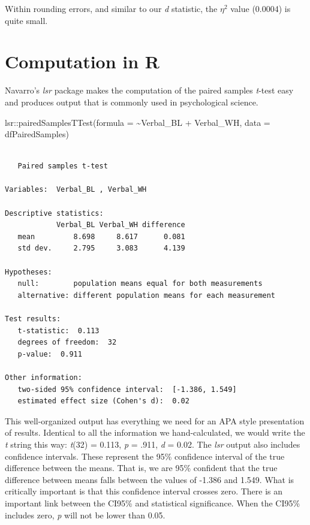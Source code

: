 \documentclass[
  11pt,
]{book}
\newenvironment{Shaded}{\begin{snugshade}}{\end{snugshade}}
\newcommand{\AttributeTok}[1]{\textcolor[rgb]{0.77,0.63,0.00}{#1}}
\newcommand{\FunctionTok}[1]{\textcolor[rgb]{0.00,0.00,0.00}{#1}}
\newcommand{\NormalTok}[1]{#1}
\newcommand{\SpecialCharTok}[1]{\textcolor[rgb]{0.00,0.00,0.00}{#1}}
\begin{document}
Within rounding errors, and similar to our \emph{d} statistic, the \(\eta^2\) value (0.0004) is quite small.

\hypertarget{computation-in-r-2}{%
\section{Computation in R}\label{computation-in-r-2}}

Navarro's \emph{lsr} package makes the computation of the paired samples \emph{t}-test easy and produces output that is commonly used in psychological science.

\begin{Shaded}
\begin{Highlighting}[]
\NormalTok{lsr}\SpecialCharTok{::}\FunctionTok{pairedSamplesTTest}\NormalTok{(}\AttributeTok{formula =} \SpecialCharTok{\textasciitilde{}}\NormalTok{Verbal\_BL }\SpecialCharTok{+}\NormalTok{ Verbal\_WH, }\AttributeTok{data =}\NormalTok{ dfPairedSamples)}
\end{Highlighting}
\end{Shaded}

\begin{verbatim}

   Paired samples t-test 

Variables:  Verbal_BL , Verbal_WH 

Descriptive statistics: 
            Verbal_BL Verbal_WH difference
   mean         8.698     8.617      0.081
   std dev.     2.795     3.083      4.139

Hypotheses: 
   null:        population means equal for both measurements
   alternative: different population means for each measurement

Test results: 
   t-statistic:  0.113 
   degrees of freedom:  32 
   p-value:  0.911 

Other information: 
   two-sided 95% confidence interval:  [-1.386, 1.549] 
   estimated effect size (Cohen's d):  0.02 
\end{verbatim}

This well-organized output has everything we need for an APA style presentation of results. Identical to all the information we hand-calculated, we would write the \emph{t} string this way: \emph{t}(32) = 0.113, \emph{p} = .911, \emph{d} = 0.02. The \emph{lsr} output also includes confidence intervals. These represent the 95\% confidence interval of the true difference between the means. That is, we are 95\% confident that the true difference between means falls between the values of -1.386 and 1.549. What is critically important is that this confidence interval crosses zero. There is an important link between the CI95\% and statistical significance. When the CI95\% includes zero, \emph{p} will not be lower than 0.05.
\end{document}
